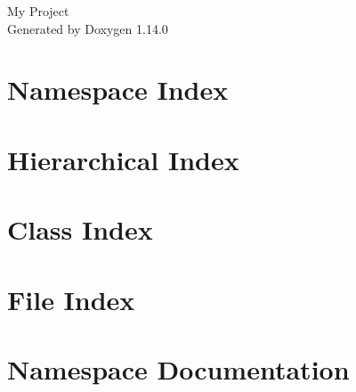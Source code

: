\documentclass[twoside]{book}
\newcommand{\+}{\discretionary{\mbox{\scriptsize$\hookleftarrow$}}{}{}}
\newcommand{\clearemptydoublepage}{%
    \newpage{\pagestyle{empty}\cleardoublepage}%
  }
\begin{document}
  \raggedbottom
    \hypersetup{pageanchor=false,
                bookmarksnumbered=true,
                pdfencoding=unicode
               }
  \begin{titlepage}
  \vspace*{7cm}
  \begin{center}%
  {\Large My Project}\\
  \vspace*{1cm}
  {\large Generated by Doxygen 1.14.0}\\
  \end{center}
  \end{titlepage}
  \clearemptydoublepage
  \tableofcontents
  \clearemptydoublepage
  \hypersetup{pageanchor=true}

\chapter{Namespace Index}

\chapter{Hierarchical Index}

\chapter{Class Index}

\chapter{File Index}

\chapter{Namespace Documentation}

\end{document}
